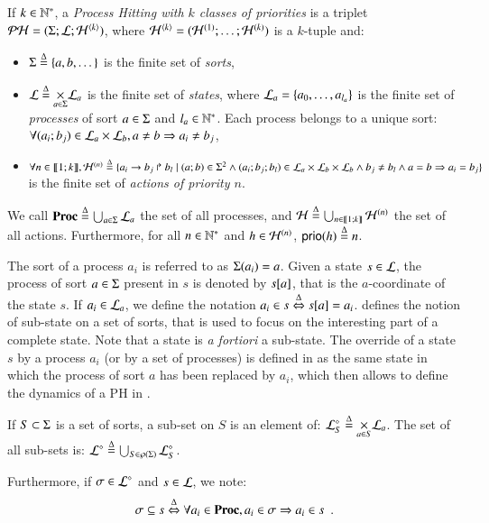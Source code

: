 \begin{definition}
\label{def:ph}
  If $k \in \sN^*$, a \emph{Process Hitting with $k$ classes of priorities} is a triplet $\PH = (\PHs; \PHl; \PHa^{\langle k \rangle})$,
  where $\PHa^{\langle k \rangle} = (\PHa^{(1)}; \dots; \PHa^{(k)})$ is a $k$-tuple and:
  \begin{itemize}
    \item $\PHs \DEF \{a, b, \dots\}$ is the finite set of \emph{sorts},
    \item $\PHl \DEF \underset{a \in \PHs}{\times} \PHl_a$ is the finite set of \emph{states}, where $\PHl_a = \{a_0, \ldots, a_{l_a}\}$ is the finite set of \emph{processes} of sort $a \in \PHs$ and $l_a \in \sN^*$. Each process belongs to a unique sort: $\forall (a_i; b_j) \in \PHl_a \times \PHl_b, a \neq b \Rightarrow a_i \neq b_j$,
    \item $\forall n \in \llbracket 1; k \rrbracket, \PHa^{(n)} \DEF \{\PHfrappe{a_i}{b_j}{b_l} \mid (a; b) \in \PHs^2 \wedge (a_i; b_j; b_l) \in \PHl_a \times \PHl_b \times \PHl_b \wedge b_j \neq b_l \wedge a = b \Rightarrow a_i = b_j \}$ is the finite set of \emph{actions of priority $n$}.
  \end{itemize}
  We call $\PHproc \DEF \bigcup_{a \in \PHs} \PHl_a$ the set of all processes, and $\PHh \DEF \bigcup_{n \in \segm{1}{k}} \PHh^{(n)}$ the set of all actions.
  Furthermore, for all $n \in \sN^*$ and $h \in \PHh^{(n)}$, $\prio(h) \DEF n$.
\end{definition}
%
\noindent
The sort of a process $a_i$ is referred to as $\PHsort(a_i) = a$.
Given a state $s\in \PHl$, the process of sort $a \in \PHs$ present in $s$ is denoted by $\PHget{s}{a}$, that is the $a$-coordinate of the state $s$.
If $a_i \in \PHl_a$, we define the notation $a_i \in s \EQDEF \PHget{s}{a} = a_i$.
 defines the notion of sub-state on a set of sorts, that is used to focus on the interesting part of a complete state.
Note that a state is \textit{a fortiori} a sub-state.
The override of a state $s$ by a process $a_i$ (or by a set of processes)
is defined in  as the same state in which the process of sort $a$ has been replaced by $a_i$,
which then allows to define the dynamics of a PH in .
%
\begin{definition}
\label{def:substate}
  If $S \subset \PHs$ is a set of sorts, a sub-set on $S$ is an element of:
  $\PHsubl[\PHl]_S \DEF \bigtimes{a \in S} \PHl_a$.
  The set of all sub-sets is:
  $\PHsubl[\PHl] \DEF \bigcup_{S \in\powerset(\PHs)} \PHsubl[\PHl]_S$.
  
  \noindent
  Furthermore, if $\mysigma \in \PHsubl[\PHl]$ and $s \in \PHl$, we note:
    \[\mysigma \subseteq s \EQDEF \forall a_i \in \Proc, a_i \in \mysigma \Rightarrow a_i \in s \enspace.\]
\end{definition}
